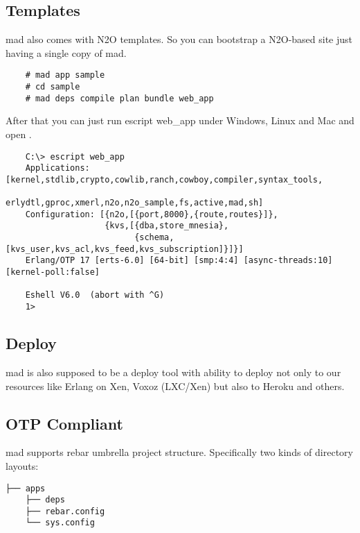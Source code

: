 \subsection{Templates}

mad also comes with N2O templates. So you can bootstrap a N2O-based site
just having a single copy of mad.

\vspace{1\baselineskip}
\begin{lstlisting}
    # mad app sample
    # cd sample
    # mad deps compile plan bundle web_app
\end{lstlisting}
\vspace{1\baselineskip}

After that you can just run escript web_app under Windows, Linux and
Mac and open .

\vspace{1\baselineskip}
\begin{lstlisting}
    C:\> escript web_app
    Applications: [kernel,stdlib,crypto,cowlib,ranch,cowboy,compiler,syntax_tools,
                   erlydtl,gproc,xmerl,n2o,n2o_sample,fs,active,mad,sh]
    Configuration: [{n2o,[{port,8000},{route,routes}]},
                    {kvs,[{dba,store_mnesia},
                          {schema,[kvs_user,kvs_acl,kvs_feed,kvs_subscription]}]}]
    Erlang/OTP 17 [erts-6.0] [64-bit] [smp:4:4] [async-threads:10] [kernel-poll:false]

    Eshell V6.0  (abort with ^G)
    1>
\end{lstlisting}
\vspace{1\baselineskip}

\subsection{Deploy}

mad is also supposed to be a deploy tool with ability to
deploy not only to our resources like Erlang on Xen, Voxoz (LXC/Xen) but
also to Heroku and others.

\subsection{OTP Compliant}

mad supports rebar umbrella project structure.
Specifically two kinds of directory layouts:

\vspace{1\baselineskip}
\begin{lstlisting}[caption=Solution]
    ├── apps
    ├── deps
    ├── rebar.config
    └── sys.config
\end{lstlisting}
\vspace{1\baselineskip}

